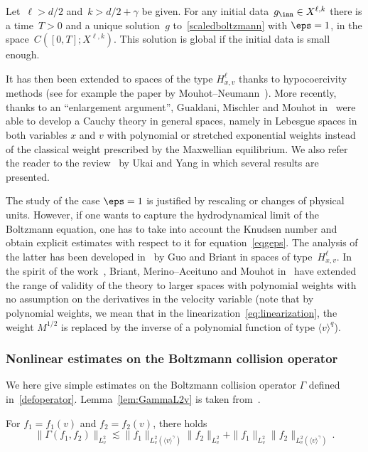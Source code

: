\begin{prop}\label{propBoltzmannGradUkai}
Let~$\ell>d/2$ and~${k>d/2+\gamma}$ be given. For any initial data~$g_{\inn} \in X^{\ell,k}$ there is a time~$T>0$ and a unique solution~$g$ to~\eqref{scaledboltzmann} with $\eps=1$, in the space~$C([0,T]; X^{\ell,k})$. This solution is global if the initial data is small enough.
\end{prop}

It has then been extended to {spaces} of the type $H^\ell_{x,v}$ thanks to hypocoercivity methods (see for example the paper by Mouhot--Neumann~\cite{Mouhot-Neumann}). More recently, thanks to an ``enlargement argument'', Gualdani, Mischler and Mouhot in~\cite{GMM} were able to develop a Cauchy theory in general spaces, namely in Lebesgue spaces in both variables $x$ and $v$ with polynomial or stretched exponential weights instead of the classical weight prescribed by the Maxwellian equilibrium. We also refer the reader to the review~\cite{Ukai-Yang} by Ukai and Yang in which several results are presented.

The study of the case $\eps=1$ is justified by rescaling or changes of physical units. However, if one wants to capture the hydrodynamical limit of the Boltzmann equation, one has to take into account the Knudsen number and obtain explicit estimates with respect to it for equation~\eqref{eqgeps}. The analysis of the latter has been developed in~\cite{Briant,Guo} by Guo and Briant in spaces of type~$H^\ell_{x,v}$. In the spirit of the work~\cite{GMM}, Briant, Merino--Aceituno and Mouhot in~\cite{Briant-Mouhot-Merino} have extended the range of validity of the theory to larger spaces with polynomial weights with no assumption on the derivatives in the velocity variable (note that by polynomial weights, we mean that in the linearization~\eqref{eq:linearization}, the weight $M^{1/2}$ is replaced by the inverse of a polynomial function of type $\langle v \rangle^q$).

\subsubsection{Nonlinear estimates on the Boltzmann collision operator}
We here give simple estimates on the Boltzmann collision operator $\Gamma$ defined in~\eqref{defoperator}. Lemma~\ref{lem:GammaL2v} is taken from~\cite[Proposition~2.1.2]{Ukai-Yang}.

\begin{lemm}\label{lem:GammaL2v}
For $f_1=f_1(v)$ and $f_2=f_2(v)$, there holds
\[
\|\Gamma(f_1,f_2)\|_{L^2_v} \lesssim \|f_1\|_{L^2_v(\langle v \rangle^\gamma)} \|f_2\|_{L^2_v} + \|f_1\|_{L^2_v} \|f_2\|_{L^2_v(\langle v \rangle^\gamma)}\,.
\]
\end{lemm}


